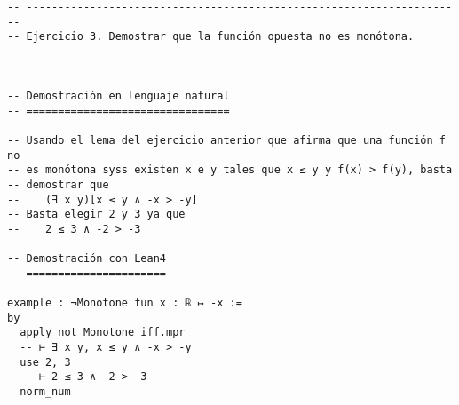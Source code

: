 \begin{verbatim}
-- ---------------------------------------------------------------------
-- Ejercicio 3. Demostrar que la función opuesta no es monótona.
-- ----------------------------------------------------------------------

-- Demostración en lenguaje natural
-- ================================

-- Usando el lema del ejercicio anterior que afirma que una función f no
-- es monótona syss existen x e y tales que x ≤ y y f(x) > f(y), basta
-- demostrar que
--    (∃ x y)[x ≤ y ∧ -x > -y]
-- Basta elegir 2 y 3 ya que
--    2 ≤ 3 ∧ -2 > -3

-- Demostración con Lean4
-- ======================

example : ¬Monotone fun x : ℝ ↦ -x :=
by
  apply not_Monotone_iff.mpr
  -- ⊢ ∃ x y, x ≤ y ∧ -x > -y
  use 2, 3
  -- ⊢ 2 ≤ 3 ∧ -2 > -3
  norm_num
\end{verbatim}

